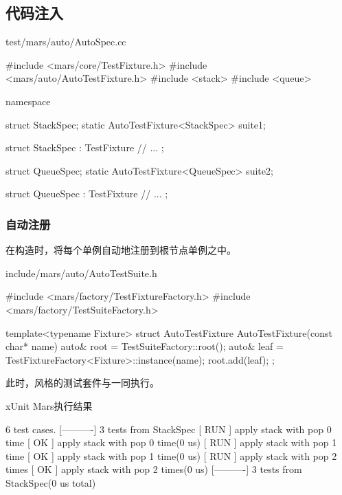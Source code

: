 \begin{content}
\subsection{代码注入}

\begin{nodiff}{test/mars/auto/AutoSpec.cc}
 \begin{c++}
#include <mars/core/TestFixture.h>
#include <mars/auto/AutoTestFixture.h>
#include <stack>
#include <queue>

namespace {
  struct StackSpec;
  static AutoTestFixture<StackSpec> suite1;

  struct StackSpec : TestFixture {
    // ...
  };

  struct QueueSpec;
  static AutoTestFixture<QueueSpec> suite2;

  struct QueueSpec : TestFixture {
    // ...
  };  
}
 \end{c++}
\end{nodiff}

\subsubsection{自动注册}

在构造时，将每个单例自动地注册到根节点单例之中。

\begin{nodiff}{include/mars/auto/AutoTestSuite.h}
 \begin{c++}
#include <mars/factory/TestFixtureFactory.h>
#include <mars/factory/TestSuiteFactory.h>

template<typename Fixture>
struct AutoTestFixture {
  AutoTestFixture(const char* name) {
    auto& root = TestSuiteFactory::root();
    auto& leaf = TestFixtureFactory<Fixture>::instance(name);
    root.add(leaf);
  }
};
 \end{c++}
\end{nodiff}

此时，风格的测试套件与一同执行。

\begin{nodiff}{xUnit Mars执行结果}
 \begin{c++}
[==========] 6 test cases.
[----------] 3 tests from StackSpec
[ RUN      ] apply stack with pop 0 time
[       OK ] apply stack with pop 0 time(0 us)
[ RUN      ] apply stack with pop 1 time
[       OK ] apply stack with pop 1 time(0 us)
[ RUN      ] apply stack with pop 2 times
[       OK ] apply stack with pop 2 times(0 us)
[----------] 3 tests from StackSpec(0 us total)


\end{c++}
\end{nodiff}
\end{content}

